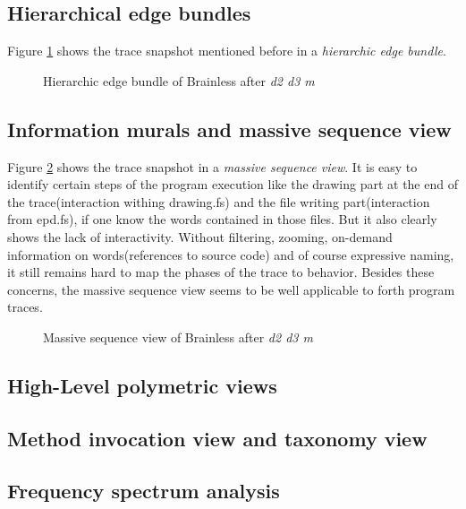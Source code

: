 \subsection*{Hierarchical edge bundles}

Figure \ref{fig:hierarchic_edge_bundle} shows the trace snapshot mentioned before in a \emph{hierarchic edge bundle}.

\begin{figure}[p]
    \centering
    
    \caption{Hierarchic edge bundle of Brainless after \emph{d2 d3 m}}
    \label{fig:hierarchic_edge_bundle}
\end{figure}


\subsection*{Information murals and massive sequence view}

Figure \ref{fig:massive_sequence_view} shows the trace snapshot in a \emph{massive sequence view}. It is easy to identify certain steps of the program execution like the drawing part at the end of the trace(interaction withing drawing.fs) and the file writing part(interaction from epd.fs), if one know the words contained in those files. But it also clearly shows the lack of interactivity. Without filtering, zooming, on-demand information on words(references to source code) and of course expressive naming, it still remains hard to map the phases of the trace to behavior. Besides these concerns, the massive sequence view seems to be well applicable to forth program traces.

\begin{figure}[p]
    \centering
    
    \caption{Massive sequence view of Brainless after \emph{d2 d3 m}}
    \label{fig:massive_sequence_view}
\end{figure}

\subsection*{High-Level polymetric views}

\subsection*{Method invocation view and taxonomy view}

\subsection*{Frequency spectrum analysis}


